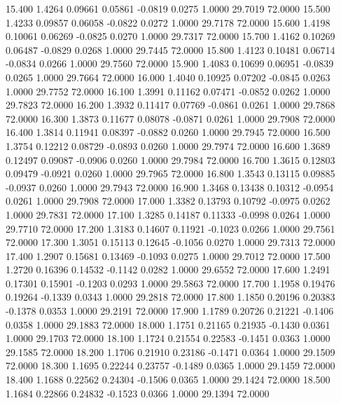   15.400   1.4264   0.09661   0.05861  -0.0819   0.0275   1.0000  29.7019  72.0000
  15.500   1.4233   0.09857   0.06058  -0.0822   0.0272   1.0000  29.7178  72.0000
  15.600   1.4198   0.10061   0.06269  -0.0825   0.0270   1.0000  29.7317  72.0000
  15.700   1.4162   0.10269   0.06487  -0.0829   0.0268   1.0000  29.7445  72.0000
  15.800   1.4123   0.10481   0.06714  -0.0834   0.0266   1.0000  29.7560  72.0000
  15.900   1.4083   0.10699   0.06951  -0.0839   0.0265   1.0000  29.7664  72.0000
  16.000   1.4040   0.10925   0.07202  -0.0845   0.0263   1.0000  29.7752  72.0000
  16.100   1.3991   0.11162   0.07471  -0.0852   0.0262   1.0000  29.7823  72.0000
  16.200   1.3932   0.11417   0.07769  -0.0861   0.0261   1.0000  29.7868  72.0000
  16.300   1.3873   0.11677   0.08078  -0.0871   0.0261   1.0000  29.7908  72.0000
  16.400   1.3814   0.11941   0.08397  -0.0882   0.0260   1.0000  29.7945  72.0000
  16.500   1.3754   0.12212   0.08729  -0.0893   0.0260   1.0000  29.7974  72.0000
  16.600   1.3689   0.12497   0.09087  -0.0906   0.0260   1.0000  29.7984  72.0000
  16.700   1.3615   0.12803   0.09479  -0.0921   0.0260   1.0000  29.7965  72.0000
  16.800   1.3543   0.13115   0.09885  -0.0937   0.0260   1.0000  29.7943  72.0000
  16.900   1.3468   0.13438   0.10312  -0.0954   0.0261   1.0000  29.7908  72.0000
  17.000   1.3382   0.13793   0.10792  -0.0975   0.0262   1.0000  29.7831  72.0000
  17.100   1.3285   0.14187   0.11333  -0.0998   0.0264   1.0000  29.7710  72.0000
  17.200   1.3183   0.14607   0.11921  -0.1023   0.0266   1.0000  29.7561  72.0000
  17.300   1.3051   0.15113   0.12645  -0.1056   0.0270   1.0000  29.7313  72.0000
  17.400   1.2907   0.15681   0.13469  -0.1093   0.0275   1.0000  29.7012  72.0000
  17.500   1.2720   0.16396   0.14532  -0.1142   0.0282   1.0000  29.6552  72.0000
  17.600   1.2491   0.17301   0.15901  -0.1203   0.0293   1.0000  29.5863  72.0000
  17.700   1.1958   0.19476   0.19264  -0.1339   0.0343   1.0000  29.2818  72.0000
  17.800   1.1850   0.20196   0.20383  -0.1378   0.0353   1.0000  29.2191  72.0000
  17.900   1.1789   0.20726   0.21221  -0.1406   0.0358   1.0000  29.1883  72.0000
  18.000   1.1751   0.21165   0.21935  -0.1430   0.0361   1.0000  29.1703  72.0000
  18.100   1.1724   0.21554   0.22583  -0.1451   0.0363   1.0000  29.1585  72.0000
  18.200   1.1706   0.21910   0.23186  -0.1471   0.0364   1.0000  29.1509  72.0000
  18.300   1.1695   0.22244   0.23757  -0.1489   0.0365   1.0000  29.1459  72.0000
  18.400   1.1688   0.22562   0.24304  -0.1506   0.0365   1.0000  29.1424  72.0000
  18.500   1.1684   0.22866   0.24832  -0.1523   0.0366   1.0000  29.1394  72.0000
